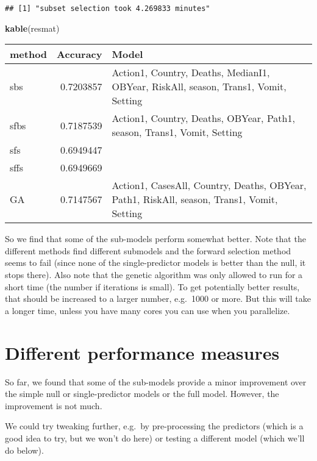 \documentclass[]{article}
\newenvironment{Shaded}{\begin{snugshade}}{\end{snugshade}}
\newcommand{\KeywordTok}[1]{\textcolor[rgb]{0.13,0.29,0.53}{\textbf{#1}}}
\newcommand{\NormalTok}[1]{#1}
\begin{document}
\begin{verbatim}
## [1] "subset selection took 4.269833 minutes"
\end{verbatim}

\begin{Shaded}
\begin{Highlighting}[]
\KeywordTok{kable}\NormalTok{(resmat)}
\end{Highlighting}
\end{Shaded}

\begin{longtable}[]{@{}lrl@{}}
\toprule
method & Accuracy & Model\tabularnewline
\midrule
\endhead
sbs & 0.7203857 & Action1, Country, Deaths, MedianI1, OBYear, RiskAll,
season, Trans1, Vomit, Setting\tabularnewline
sfbs & 0.7187539 & Action1, Country, Deaths, OBYear, Path1, season,
Trans1, Vomit, Setting\tabularnewline
sfs & 0.6949447 &\tabularnewline
sffs & 0.6949669 &\tabularnewline
GA & 0.7147567 & Action1, CasesAll, Country, Deaths, OBYear, Path1,
RiskAll, season, Trans1, Vomit, Setting\tabularnewline
\bottomrule
\end{longtable}

So we find that some of the sub-models perform somewhat better. Note
that the different methods find different submodels and the forward
selection method seems to fail (since none of the single-predictor
models is better than the null, it stops there). Also note that the
genetic algorithm was only allowed to run for a short time (the number
if iterations is small). To get potentially better results, that should
be increased to a larger number, e.g.~1000 or more. But this will take a
longer time, unless you have many cores you can use when you
parallelize.

\hypertarget{different-performance-measures}{%
\section{Different performance
measures}\label{different-performance-measures}}

So far, we found that some of the sub-models provide a minor improvement
over the simple null or single-predictor models or the full model.
However, the improvement is not much.

We could try tweaking further, e.g.~by pre-processing the predictors
(which is a good idea to try, but we won't do here) or testing a
different model (which we'll do below).
\end{document}
